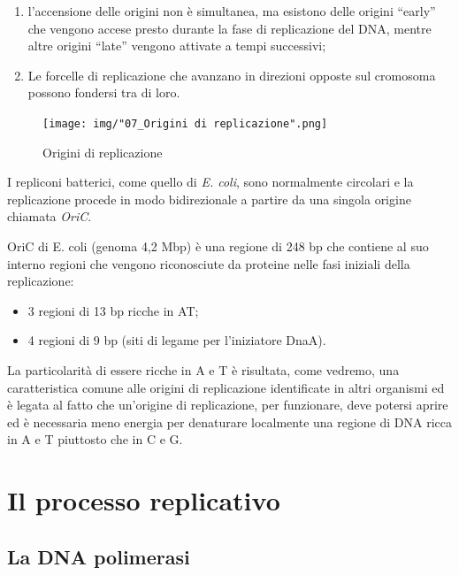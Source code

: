 \documentclass[11pt]{book}
\begin{document}
\begin{enumerate}
\def\labelenumi{\arabic{enumi}.}
\itemsep1pt\parskip0pt
\item
  l'accensione delle origini non è simultanea, ma esistono delle origini
  ``early'' che vengono accese presto durante la fase di replicazione
  del DNA, mentre altre origini ``late'' vengono attivate a tempi
  successivi;
\item
  Le forcelle di replicazione che avanzano in direzioni opposte sul
  cromosoma possono fondersi tra di loro.
\end{enumerate}

\begin{figure}[htp]
\centering
\texttt{[image: img/"07\_Origini di replicazione".png]}
\caption{Origini di replicazione}
\label{origini-di-replicazione}
\end{figure}

I repliconi batterici, come quello di \emph{E. coli}, sono normalmente
circolari e la replicazione procede in modo bidirezionale a partire da
una singola origine chiamata \emph{OriC}.

OriC di E. coli (genoma 4,2 Mbp) è una regione di 248 bp che contiene al
suo interno regioni che vengono riconosciute da proteine nelle fasi
iniziali della replicazione:

\begin{itemize}
\itemsep1pt\parskip0pt
\item
  3 regioni di 13 bp ricche in AT;
\item
  4 regioni di 9 bp (siti di legame per l'iniziatore DnaA).
\end{itemize}

La particolarità di essere ricche in A e T è risultata, come vedremo,
una caratteristica comune alle origini di replicazione identificate in
altri organismi ed è legata al fatto che un'origine di replicazione, per
funzionare, deve potersi aprire ed è necessaria meno energia per
denaturare localmente una regione di DNA ricca in A e T piuttosto che in
C e G.

\clearpage

\section{Il processo replicativo}\label{il-processo-replicativo}

\subsection{La DNA polimerasi}\label{la-dna-polimerasi}
\end{document}
